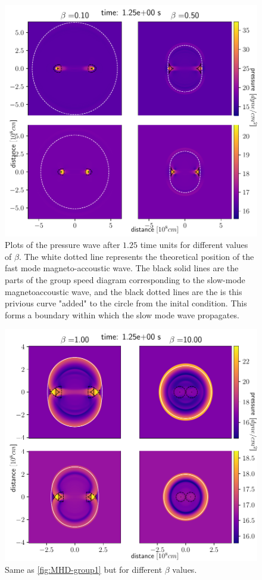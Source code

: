 \begin{figure}[H]
	\centering
	\includegraphics[width=\linewidth]{images/group-speed-pressure1.pdf}
	\caption{Plots of the pressure wave after $1.25$ time units for different values of $\beta$. The white dotted line represents the theoretical position of the fast mode magneto-accoustic wave. The black solid lines are the parts of the group speed diagram corresponding to the slow-mode magnetoaccoustic wave, and the black dotted lines are the is this privious curve "added" to the circle from the inital condition. This forms a boundary within which the slow mode wave propagates.}
	\label{fig:MHD-group1}
\end{figure}

\begin{figure}[H]
	\centering
	\includegraphics[width=\linewidth]{images/group-speed-pressure2.pdf}
	\caption{Same as \autoref{fig:MHD-group1} but for different $\beta$ values.}
	\label{fig:MHD-group2}
\end{figure}


